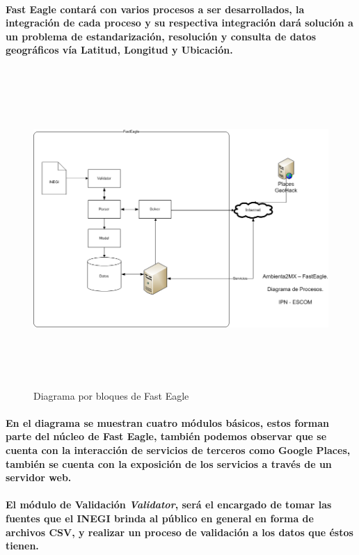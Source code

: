       \paragraph{Fast Eagle contará con varios procesos a ser desarrollados, la integración de cada proceso y su respectiva integración dará solución a un problema de estandarización, resolución y consulta de datos geográficos vía Latitud, Longitud y Ubicación.}
    \newpage
      \begin{landscape}
        \begin{figure}[b!]
        \centering
        \includegraphics[width=22.5cm,height=12cm]{./images/DiagramaFastEagle.png}
        \caption{Diagrama por bloques de Fast Eagle}
      \end{figure}
      \end{landscape}
    \newpage
    \paragraph{En el diagrama se muestran cuatro módulos básicos, estos forman parte del núcleo de Fast Eagle, también podemos observar que se cuenta con la interacción de servicios de terceros como Google Places,  también se cuenta con la exposición de los servicios a través de un servidor  web.}
    \paragraph{El módulo de Validación \textbf{\emph{Validator}}, será el encargado de tomar las fuentes que el INEGI brinda al público en general en forma de archivos CSV, y realizar un proceso de validación a los datos que éstos tienen.}
